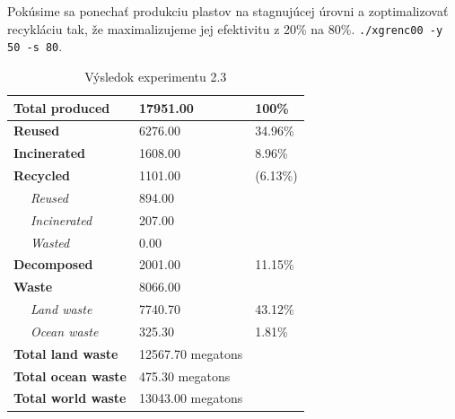 \documentclass[a4paper, 11pt]{article}
\begin{document}
\pagebreak
Pokúsime sa ponechať produkciu plastov na stagnujúcej úrovni a zoptimalizovať recykláciu tak, že maximalizujeme jej efektivitu z 20\% na 80\%.
\texttt{./xgrenc00 -y 50 -s 80}.

\begin{table}[ht]
	\centering
	\begin{tabular}{|l|l|l|l|}
		\hline
		\multicolumn{2}{|l|}{\textbf{Total produced}}    & 17951.00             & 100\%              \\ \hline
		\multicolumn{2}{|l|}{\textbf{Reused}}            & 6276.00              & 34.96\%            \\ \hline
		\multicolumn{2}{|l|}{\textbf{Incinerated}}       & 1608.00              & 8.96\%             \\ \hline
		\multicolumn{2}{|l|}{\textbf{Recycled}}          & 1101.00              & (6.13\%)           \\ \hline
		                                                 & \textit{Reused}      & 894.00   &         \\ \hline
		                                                 & \textit{Incinerated} & 207.00   &         \\ \hline
		                                                 & \textit{Wasted}      & 0.00     &         \\ \hline
		\multicolumn{2}{|l|}{\textbf{Decomposed}}        & 2001.00              & 11.15\%            \\ \hline
		\multicolumn{2}{|l|}{\textbf{Waste}}             & 8066.00              &                    \\ \hline
		                                                 & \textit{Land waste}  & 7740.70  & 43.12\% \\ \hline
		                                                 & \textit{Ocean waste} & 325.30   & 1.81\%  \\ \hline
		\multicolumn{2}{|l|}{\textbf{Total land waste}}  & 12567.70 megatons    &                    \\ \hline
		\multicolumn{2}{|l|}{\textbf{Total ocean waste}} & 475.30 megatons      &                    \\ \hline
		\multicolumn{2}{|l|}{\textbf{Total world waste}} & 13043.00 megatons    &                    \\ \hline
	\end{tabular}
	\caption{Výsledok experimentu 2.3}
	\label{tab:4}
\end{table}
\end{document}
